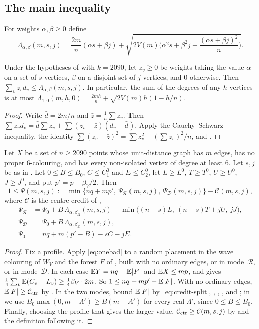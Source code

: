 \documentclass[11pt,colorlinks]{charlie}
\newcommand{\cR}{\mathcal{R}}
\newcommand{\cD}{\mathcal{D}}
\begin{document}
\subsection{The main inequality}
For weights $\alpha,\beta\ge0$ define
\[
 \Lambda_{\alpha,\beta}(m,s,j)=\frac{2m}{n}(\alpha s+\beta j)+\sqrt{2V(m)\Big(\alpha^2s+\beta^2j-\frac{(\alpha s+\beta j)^2}{n}\Big)} .
\]

\begin{lemma}\label{lem:CS}
Under the hypotheses of  with $k=2090$, let $z_v\ge0$ be weights taking the value $\alpha$ on a set of $s$ vertices, $\beta$ on a disjoint set of $j$ vertices, and $0$ otherwise. Then $\sum_vz_vd_v\le\Lambda_{\alpha,\beta}(m,s,j)$. In particular, the sum of the degrees of any $h$ vertices is at most $\Lambda_{1,0}(m,h,0)=\frac{2mh}n+\sqrt{2V(m)h(1-h/n)}$.
\end{lemma}
\begin{proof}
Write $\bar d=2m/n$ and $\bar z=\frac1n\sum z_v$. Then $\sum z_vd_v=\bar d\sum z_v+\sum(z_v-\bar z)(d_v-\bar d)$. Apply the Cauchy--Schwarz inequality, the identity $\sum(z_v-\bar z)^2=\sum z_v^2-(\sum z_v)^2/n$, and .
\end{proof}

\begin{proposition}\label{prop:main}
Let $X$ be a set of $n\ge2090$ points whose unit-distance graph has $m$ edges, has no proper $6$-colouring, and has every non-isolated vertex of degree at least $6$. Let $s,j$ be as in . Let $0\le B\le B_0$, $C\le C^0_1$ and $E\le C^0_2$, let $L\ge L^0$, $T\ge T^0$, $U\ge U^0$, $J\ge J^0$, and put $p'=p-\beta_V/2$. Then
\[
 1\le\Psi(m,s,j):=\min\big\{nq+mp',\ \Psi_\cR(m,s,j),\ \Psi_\cD(m,s,j)\big\}-\mathcal C(m,s,j),
\]
where $\mathcal C$ is the centre credit of ,
\begin{align*}
 \Psi_\cR&=\Psi_0+B\,\Lambda_{\alpha,\beta_\cR}(m,s,j)+\min\big((n-s)L,\ (n-s)T+jU,\ jJ\big),\\
 \Psi_\cD&=\Psi_0+B\,\Lambda_{\alpha,\beta_\cD}(m,s,j),\\
 \Psi_0&=nq+m(p'-B)-sC-jE .
\end{align*}
\end{proposition}

\begin{proof}
Fix a profile. Apply \eqref{eq:onebad} to a random placement in the wave colouring of $W_V$ and the forest $F$ of , built with no ordinary edges, or in mode~$\cR$, or in mode~$\cD$. In each case $\mathbb{E} Y=nq-\mathbb{E}|F|$ and $\mathbb{E} X\le mp$, and  gives $\frac14\sum_v\mathbb{E}(C_v-L_v)\ge\frac14\beta_V\cdot2m$. So $1\le nq+mp'-\mathbb{E}|F|$. With no ordinary edges, $\mathbb{E}|F|\ge\mathcal C_{\rm ctr}$ by . In the two modes, bound $\mathbb{E}|F|$ by~\eqref{eq:credit-split}, , , ,  and ; in  we use $B_0\max(0,m-\Lambda')\ge B(m-\Lambda')$ for every real $\Lambda'$, since $0\le B\le B_0$. Finally, choosing the profile that gives the larger value, $\mathcal C_{\rm ctr}\ge\mathcal C(m,s,j)$ by  and the definition following it.
\end{proof}
\end{document}
